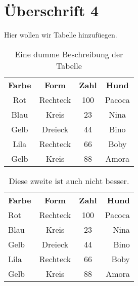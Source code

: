     \section{Überschrift 4}

    Hier wollen wir Tabelle hinzufüegen.
    \begin{table}
        \centering
        \begin{tabular}{|c|c|c|c|}
            \textbf{Farbe} & \textbf{Form} &   \textbf{Zahl} & \textbf{Hund} \\
            Rot             & Rechteck      &  100           & Pacoca  \\
            Blau            & Kreis         &  23            & Nina  \\
            Gelb            & Dreieck       &  44            & Bino  \\
            Lila            & Rechteck      &  66            & Boby  \\
            Gelb            & Kreis         &  88            & Amora  \\
        \end{tabular}
        \caption{Eine dumme Beschreibung der Tabelle}
        \label{tbl:beispieltabelle1}
    \end{table}


    \begin{table}
        \centering
        \begin{tabular}{|lccr|}
            \hline
            \textbf{Farbe} & \textbf{Form} &   \textbf{Zahl} & \textbf{Hund} \\
            Rot             & Rechteck      &  100           & Pacoca  \\
            \hline
            Blau            & Kreis         &  23            & Nina  \\
            \hline
            Gelb            & Dreieck       &  44            & Bino  \\
            \hline
            Lila            & Rechteck      &  66            & Boby  \\
            \hline
            Gelb            & Kreis         &  88            & Amora  \\
            \hline
        \end{tabular}
        \caption{Diese zweite ist auch nicht besser.}
        \label{tbl:beispieltabelle1}
    \end{table}